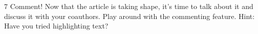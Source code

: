7 Comment!
Now that the article is taking shape, it’s time to talk about it and discuss it with your coauthors. Play around with the commenting feature. Hint: Have you tried highlighting text?